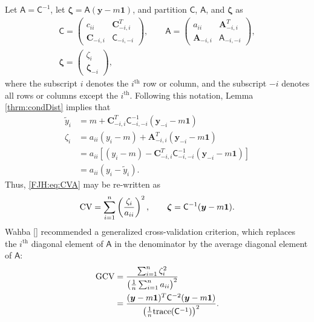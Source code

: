 \documentclass[twocolumn]{svjour3}          %
\newcommand{\bm}[1]{\boldsymbol{#1}}
\newcommand{\trace}[1]{\textup{trace}{#1}}
\newcommand{\vzeta}{{\bm{\zeta}}}
\newcommand{\vA}{\bm{A}}
\newcommand{\vC}{\bm{C}}
\newcommand{\vy}{\bm{y}}
\newcommand{\vone}{\bm{1}}
\newcommand{\mA}{\mathsf{A}}
\newcommand{\mC}{\mathsf{C}}
\begin{document}
Let $\mA = \mC^{-1}$, let $\vzeta = \mA (\vy - m \vone)$, and partition $\mC$, $\mA$, and $\vzeta$ as
\begin{gather*}
\mC = \begin{pmatrix} c_{ii}  & \vC_{-i,i}^T \\  \vC_{-i,i} & \mC_{-i,-i}\end{pmatrix}, \qquad
\mA = \begin{pmatrix} a_{ii}  & \vA_{-i,i}^T \\  \vA_{-i,i} & \mA_{-i,-i}\end{pmatrix}, \\ \vzeta = \begin{pmatrix} \zeta_i   \\  \vzeta_{-i} \end{pmatrix},
\end{gather*}
where the subscript $i$ denotes the $i^{\text{th}}$ row or column, and the subscript $-i$ denotes all rows or columns except the $i^{\text{th}}$. Following this notation, Lemma \ref{thrm:condDist} implies that 
\begin{align*}
\widetilde{y}_i & = m + \vC^T_{-i,i} \mC_{-i,-i}^{-1} (\vy_{-i} -m \vone)  \\
\zeta_i  & = a_{ii}(y_i - m) + \vA_{-i,i}^T(\vy_{-i} - m \vone) \\
& = a_{ii}[(y_i - m) - \vC^T_{-i,i} \mC_{-i,-i}^{-1} (\vy_{-i} -m \vone)] \\
& = a_{ii}(y_i - \widetilde{y}_i).
\end{align*}
Thus, \eqref{FJH:eq:CVA} may be re-written as 
\begin{equation*} %
\textup{CV} = \sum_{i=1}^n \left(\frac{\zeta_i}{a_{ii}} \right)^2, \qquad \vzeta = \mC^{-1}(\vy - m \vone).
\end{equation*}
Wahba \ref{} recommended a generalized cross-validation criterion, which replaces the $i^{\text{th}}$ diagonal element of $\mA$ in the denominator by the average diagonal element of $\mA$:
\begin{align} 
\nonumber
\textup{GCV} &
= \frac{\sum_{i=1}^n\zeta_i^2}{\left(\frac 1n \sum_{i=1}^n a_{ii} \right)^2} \\
\label{FJH:eq:GCV}
& = \frac{(\vy - m\vone)^T \mC^{-2} (\vy - m \vone)}{\left(\frac 1n \trace(\mC^{-1}) \right)^2}.
\end{align}
\end{document}
